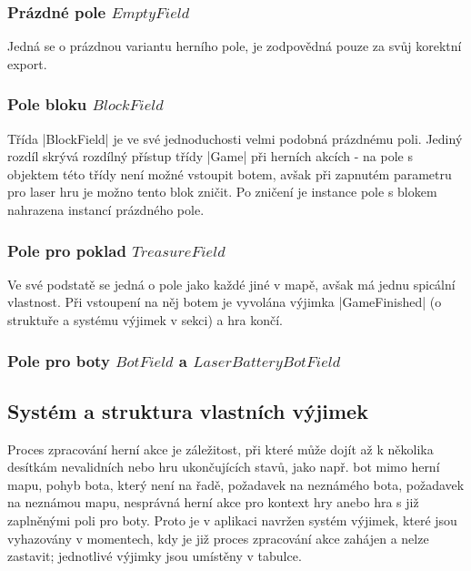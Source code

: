 \subsubsection{Prázdné pole $EmptyField$}

Jedná se o prázdnou variantu herního pole, je zodpovědná pouze za svůj korektní export.

\subsubsection{Pole bloku $BlockField$}

Třída \ic|BlockField| je ve své jednoduchosti velmi podobná prázdnému poli. Jediný rozdíl skrývá rozdílný přístup třídy \ic|Game| při herních akcích - na pole s objektem této třídy není možné vstoupit botem, avšak při zapnutém parametru pro laser hru je možno tento blok zničit. Po zničení je instance pole s blokem nahrazena instancí prázdného pole.

\subsubsection{Pole pro poklad $TreasureField$}

Ve své podstatě se jedná o pole jako každé jiné v mapě, avšak má jednu spicální vlastnost. Při vstoupení na něj botem je vyvolána výjimka \ic|GameFinished| (o struktuře a systému výjimek v sekci) a hra končí. 

\subsubsection{Pole pro boty $BotField$ a $LaserBatteryBotField$}

\subsection{Systém a struktura vlastních výjimek}
\label{subsec:custom-exceptions}

Proces zpracování herní akce je záležitost, při které může dojít až k několika desítkám nevalidních nebo hru ukončujících stavů, jako např. bot mimo herní mapu, pohyb bota, který není na řadě, požadavek na neznámého bota, požadavek na neznámou mapu, nesprávná herní akce pro kontext hry anebo hra s již zaplněnými poli pro boty. Proto je v aplikaci navržen systém výjimek, které jsou vyhazovány v momentech, kdy je již proces zpracování akce zahájen a nelze zastavit; jednotlivé výjimky jsou umístěny v tabulce.

